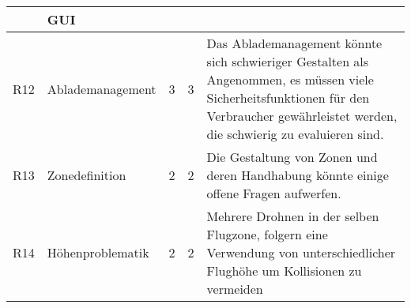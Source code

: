 \begin{longtable}{llccX}
\newpage

\midrule
	& \textbf{GUI} &  & & \\
\midrule
R12 & Ablademanagement & 3 & 3 & Das Ablademanagement könnte sich schwieriger Gestalten als Angenommen, es müssen viele Sicherheitsfunktionen für den Verbraucher gewährleistet werden, die schwierig zu evaluieren sind. \\
R13 & Zonedefinition & 2 & 2 & Die Gestaltung von Zonen und deren Handhabung könnte einige offene Fragen aufwerfen. \\
R14 & Höhenproblematik & 2 & 2 & Mehrere Drohnen in der selben Flugzone, folgern eine Verwendung von unterschiedlicher Flughöhe um Kollisionen zu vermeiden \\

\bottomrule
\end{longtable}